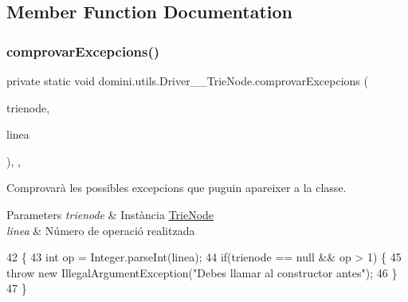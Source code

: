 \subsection{Member Function Documentation}
\mbox{\label{classdomini_1_1utils_1_1Driver____TrieNode_aa763a74162f647ee153c5cea01d371d0}} 
\subsubsection{\texorpdfstring{comprovar\+Excepcions()}{comprovarExcepcions()}}
{\footnotesize\ttfamily private static void domini.\+utils.\+Driver\+\_\+\+\_\+\+Trie\+Node.\+comprovar\+Excepcions (\begin{DoxyParamCaption}\item[{\hyperlink{classdomini_1_1utils_1_1TrieNode}{Trie\+Node}$<$ Byte $>$}]{trienode,  }\item[{String}]{linea }\end{DoxyParamCaption})\hspace{0.3cm}{\ttfamily [inline]}, {\ttfamily [static]}, {\ttfamily [private]}}



Comprovarà les possibles excepcions que puguin apareixer a la classe. 


\begin{DoxyParams}{Parameters}
{\em trienode} & Instància \hyperlink{classdomini_1_1utils_1_1TrieNode}{Trie\+Node} \\
\hline
{\em linea} & Número de operació realitzada \\
\hline
\end{DoxyParams}

\begin{DoxyCode}
42                                                                                   \{
43         \textcolor{keywordtype}{int} op = Integer.parseInt(linea);
44         \textcolor{keywordflow}{if}(trienode == null && op > 1) \{
45             \textcolor{keywordflow}{throw} \textcolor{keyword}{new} IllegalArgumentException(\textcolor{stringliteral}{"Debes llamar al constructor antes"});
46         \}
47     \}
\end{DoxyCode}
\mbox{\label{classdomini_1_1utils_1_1Driver____TrieNode_a19cb816408fb6b32cca0ea8ae8bc4153}} 
